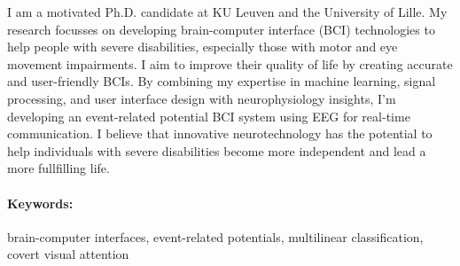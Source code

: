 \documentclass[10pt,a4paper]{article}
\begin{document}
%

I am a motivated Ph.D. candidate at KU Leuven and the University of Lille. My research focusses on developing brain-computer interface (BCI) technologies to help people with severe disabilities, especially those with motor and eye movement impairments. I aim to improve their quality of life by creating accurate and user-friendly BCIs. By combining my expertise in machine learning, signal processing, and user interface design with neurophysiology insights, I'm developing an event-related potential BCI system using EEG for real-time communication. I believe that innovative neurotechnology has the potential to help individuals with severe disabilities become more independent and lead a more fullfilling life.

\paragraph{Keywords:} brain-computer interfaces, event-related
potentials, multilinear classification, covert visual attention
\end{document}
